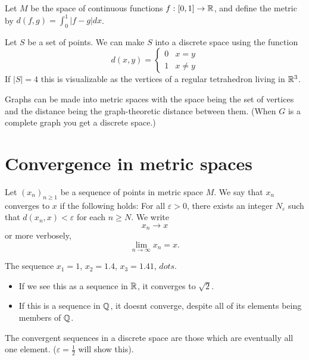 \documentclass[11pt]{scrreport}
\begin{document}
\begin{example}
    Let $M$ be the space of continuous functions $f:[0,1] \to \mathbb R$, and define the metric by $d(f,g)=\int_0^1|f-g|dx$.
\end{example}
\begin{example}
    Let $S$ be a set of points. We can make $S$ into a discrete space using the function
    \[d(x,y)=\begin{cases}
        0&x=y \\
        1&x\neq y
    \end{cases}\]
    If $|S|=4$ this is visualizable as the vertices of a regular tetrahedron living in $\mathbb R^3$.
\end{example}
\begin{example}
    Graphs can be made into metric spaces with the space being the set of vertices and the distance being the graph-theoretic distance between them. (When $G$ is a complete graph you get a discrete space.)
\end{example}
\section{Convergence in metric spaces}
\begin{definition}
    Let $(x_n)_{n\geq 1}$ be a sequence of points in metric space $M$. We say that $x_n$ converges to $x$ if the following holds: For all $\varepsilon>0$, there exists an integer $N_\varepsilon$ such that $d(x_n,x)<\varepsilon$ for each $n\geq N$. We write
    \[x_n\to x\] or more verbosely, \[\lim_{n\to\infty}x_n=x.\]
\end{definition}
\begin{example}
    The sequence $x_1=1$, $x_2=1.4$, $x_3=1.41$, $dots$.
    \begin{itemize}
        \item If we see this as a sequence in $\mathbb R$, it converges to $\sqrt2$.
        \item If this is a sequence in $\mathbb Q$, it doesnt converge, despite all of its elements being members of $\mathbb Q$.
    \end{itemize}
\end{example}
\begin{remark}
    The convergent sequences in a discrete space are those which are eventually all one element. ($\varepsilon = \frac12$ will show this).
\end{remark}
\end{document}
